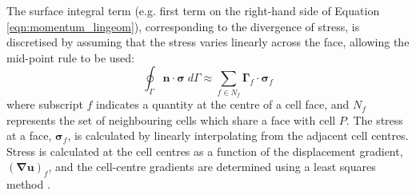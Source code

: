 \documentclass[sn-mathphys,Numbered,draft]{sn-jnl}%
\newcommand{\bb}{\boldsymbol}
\begin{document}
The surface integral term (e.g. first term on the right-hand side of Equation \ref{eqn:momentum_lingeom}), corresponding to the divergence of stress, is discretised by assuming that the stress varies linearly across the face, allowing the mid-point rule to be used:
\begin{equation}
	\oint_{\Gamma} \bb{n} \cdot \bb{\sigma}  \; d\Gamma
	\approx 
	\sum_{f \in N_f} \bb{\Gamma}_{f} \cdot \bb{\sigma}_f
\end{equation}
where subscript $f$ indicates a quantity at the centre of a cell face, and $N_f$ represents the set of neighbouring cells which share a face with cell $P$.
The stress at a face, $\bb{\sigma}_f$, is calculated by linearly interpolating from the adjacent cell centres.
Stress is calculated at the cell centres as a function of the displacement gradient, $\left(\bb{\nabla}\bb{u}\right)_f$, and the cell-centre gradients are determined using a least squares method \cite{noauthor_openfoam_2015}.
\end{document}
